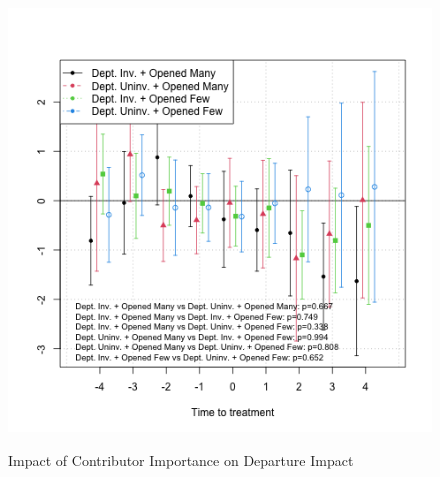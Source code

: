 \begin{figure}[htbp]
\begin{minipage}[b]{0.32\textwidth}
    \label{fig:prs_opened_opened}
    \end{minipage}
    \hfill
    \begin{minipage}[b]{0.32\textwidth}
        \centering
        \includegraphics[width=\textwidth]{temp/output/collab/prs_opened_involved_departed_opened_cs_norm.png}
    \label{fig:prs_opened_involved_opened}
    \end{minipage}
    
    \caption{Impact of Contributor Importance on Departure Impact}
    \label{fig:prs_opened_more_imp}
\end{figure}
